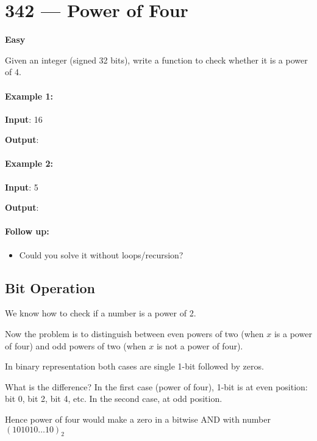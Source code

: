 \section{342 --- Power of Four}

\textbf{Easy}

Given an integer (signed 32 bits), write a function to check whether it is a power of 4.

\paragraph{Example 1:}

\begin{flushleft}
\textbf{Input}: 16

\textbf{Output}: 
\end{flushleft}

\paragraph{Example 2:}

\begin{flushleft}
\textbf{Input}: 5

\textbf{Output}: 
\end{flushleft}

\paragraph{Follow up:}
\begin{itemize}
\item Could you solve it without loops/recursion?
\end{itemize}

\subsection{Bit Operation}
We know how to check if a number is a power of 2.

Now the problem is to distinguish between even powers of two (when $x$ is a power of four) and odd powers of two (when $x$ is not a power of four). 

In binary representation both cases are single 1-bit followed by zeros.

What is the difference? In the first case (power of four), 1-bit is at even position: bit 0, bit 2, bit 4, etc. In the second case, at odd position.

Hence power of four would make a zero in a bitwise AND with number $(101010\ldots 10)_2$

